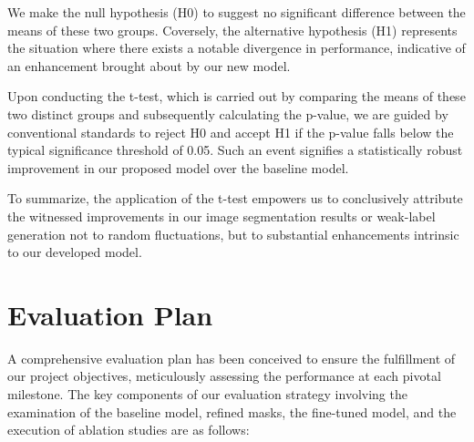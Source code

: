We make the null hypothesis (H0) to suggest no significant difference between the means of these two groups. Coversely, the alternative hypothesis (H1) represents the situation where there exists a notable divergence in performance, indicative of an enhancement brought about by our new model.

Upon conducting the t-test, which is carried out by comparing the means of these two distinct groups and subsequently calculating the p-value, we are guided by conventional standards to reject H0 and accept H1 if the p-value falls below the typical significance threshold of 0.05. Such an event signifies a statistically robust improvement in our proposed model over the baseline model.

To summarize, the application of the t-test empowers us to conclusively attribute the witnessed improvements in our image segmentation results or weak-label generation not to random fluctuations, but to substantial enhancements intrinsic to our developed model.

\section{Evaluation Plan}
A comprehensive evaluation plan has been conceived to ensure the fulfillment of our project objectives, meticulously assessing the performance at each pivotal milestone. The key components of our evaluation strategy involving the examination of the baseline model, refined masks, the fine-tuned model, and the execution of ablation studies are as follows:

